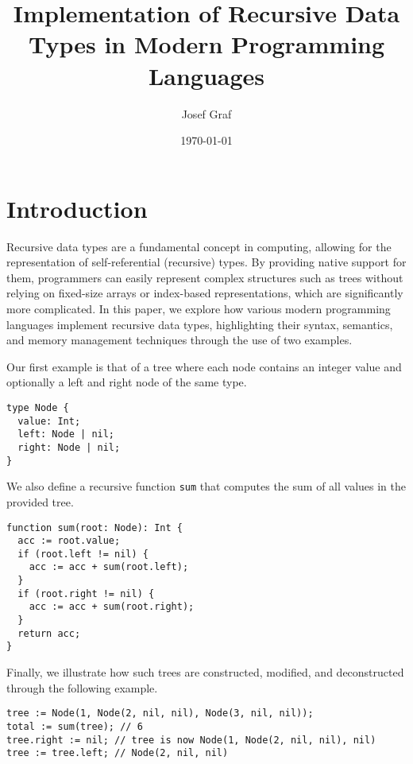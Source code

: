 \documentclass[12pt, letterpaper]{article}
\title{Implementation of Recursive Data Types in Modern Programming Languages}
\author{Josef Graf}
\date{\today}
\begin{document}
\maketitle

\newpage

\section{Introduction}
Recursive data types are a fundamental concept in computing, allowing for the representation of self-referential (recursive) types. By providing native support for them, programmers can easily represent complex structures such as trees without relying on fixed-size arrays or index-based representations, which are significantly more complicated. In this paper, we explore how various modern programming languages implement recursive data types, highlighting their syntax, semantics, and memory management techniques through the use of two examples.

Our first example is that of a tree where each node contains an integer value and optionally a left and right node of the same type.
\begin{verbatim}
type Node {
  value: Int;
  left: Node | nil;
  right: Node | nil;
}
\end{verbatim}
We also define a recursive function \texttt{sum} that computes the sum of all values in the provided tree.
\begin{verbatim}
function sum(root: Node): Int {
  acc := root.value;
  if (root.left != nil) {
    acc := acc + sum(root.left);
  }
  if (root.right != nil) {
    acc := acc + sum(root.right);
  }
  return acc;
}
\end{verbatim}
Finally, we illustrate how such trees are constructed, modified, and deconstructed through the following example.
\begin{verbatim}
tree := Node(1, Node(2, nil, nil), Node(3, nil, nil));
total := sum(tree); // 6
tree.right := nil; // tree is now Node(1, Node(2, nil, nil), nil)
tree := tree.left; // Node(2, nil, nil)
\end{verbatim}
\end{document}
